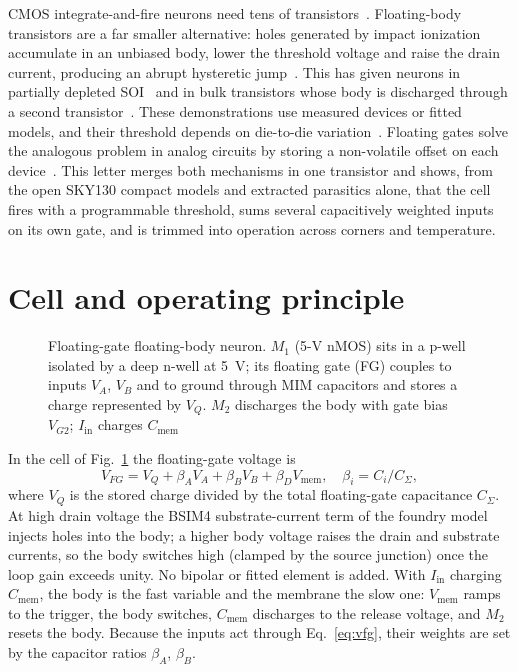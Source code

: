 \documentclass[pdflatex,sn-mathphys-num,iicol]{sn-jnl}
\begin{document}
CMOS integrate-and-fire neurons need tens of transistors~\cite{indiveri2011}. Floating-body transistors are a far smaller alternative: holes generated by impact ionization accumulate in an unbiased body, lower the threshold voltage and raise the drain current, producing an abrupt hysteretic jump~\cite{park2018kink}. This has given neurons in partially depleted SOI~\cite{dutta2017} and in bulk transistors whose body is discharged through a second transistor~\cite{pazos2025}. These demonstrations use measured devices or fitted models, and their threshold depends on die-to-die variation~\cite{pazos2025}. Floating gates solve the analogous problem in analog circuits by storing a non-volatile offset on each device~\cite{diorio1996,bhattacharyya2025,hasler2021woset}. This letter merges both mechanisms in one transistor and shows, from the open SKY130 compact models and extracted parasitics alone, that the cell fires with a programmable threshold, sums several capacitively weighted inputs on its own gate, and is trimmed into operation across corners and temperature.

\section{Cell and operating principle}\label{sec:cell}

\begin{figure}[t]
\centering
\resizebox{0.85\linewidth}{!}{}
\caption{Floating-gate floating-body neuron. $M_1$ (5-V nMOS) sits in a p-well isolated by a deep n-well at 5~V; its floating gate (FG) couples to inputs $V_A$, $V_B$ and to ground through MIM capacitors and stores a charge represented by $V_Q$. $M_2$ discharges the body with gate bias $V_{G2}$; $I_{\mathrm{in}}$ charges $C_{\mathrm{mem}}$}
\label{fig:schematic}
\end{figure}

In the cell of Fig.~\ref{fig:schematic} the floating-gate voltage is
\begin{equation}
V_{FG} = V_Q + \beta_A V_A + \beta_B V_B + \beta_D V_{\mathrm{mem}},\quad \beta_i = C_i/C_\Sigma ,
\label{eq:vfg}
\end{equation}
where $V_Q$ is the stored charge divided by the total floating-gate capacitance $C_\Sigma$. At high drain voltage the BSIM4 substrate-current term of the foundry model~\cite{bsim4} injects holes into the body; a higher body voltage raises the drain and substrate currents, so the body switches high (clamped by the source junction) once the loop gain exceeds unity. No bipolar or fitted element is added. With $I_{\mathrm{in}}$ charging $C_{\mathrm{mem}}$, the body is the fast variable and the membrane the slow one: $V_{\mathrm{mem}}$ ramps to the trigger, the body switches, $C_{\mathrm{mem}}$ discharges to the release voltage, and $M_2$ resets the body. Because the inputs act through Eq.~\eqref{eq:vfg}, their weights are set by the capacitor ratios $\beta_A$, $\beta_B$.
\end{document}
